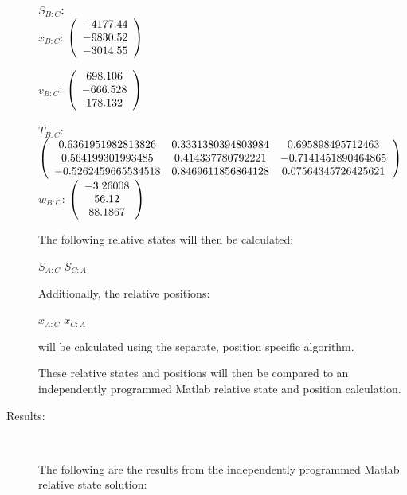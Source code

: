 \begin{description}
\Large{\textbf{$S_{B:C}$:}} \normalsize \\

$x_{B:C}$: $\left( \begin{array} {ccc}  -4177.44 \\   -9830.52 \\   -3014.55
\end{array} \right)\\ \\$

$v_{B:C}$:  $\left( \begin{array} {ccc} 698.106 \\   -666.528 \\    178.132
\end{array} \right)\\ \\$

$T_{B:C}$: $\left( \begin{array} {ccc}
 0.6361951982813826 & 0.3331380394803984 & 0.695898495712463 \\
  0.564199301993485 & 0.414337780792221 & -0.7141451890464865 \\
  -0.5262459665534518 & 0.8469611856864128 & 0.07564345726425621

\end{array} \right)\\ \\$
$w_{B:C}$:  $\left( \begin{array} {ccc} -3.26008 \\      56.12 \\    88.1867
\end{array} \right)\\ \\$

The following relative states will then be calculated:

$S_{A:C}$
$S_{C:A}$

Additionally, the relative positions:

$x_{A:C}$
$x_{C:A}$

will be calculated using the separate, position specific algorithm.

These relative states and positions will then be compared to an
independently programmed Matlab relative state and position calculation.

\item[Results:] \ \newline

The following are the results from the independently programmed Matlab relative state
solution:



\end{description}

